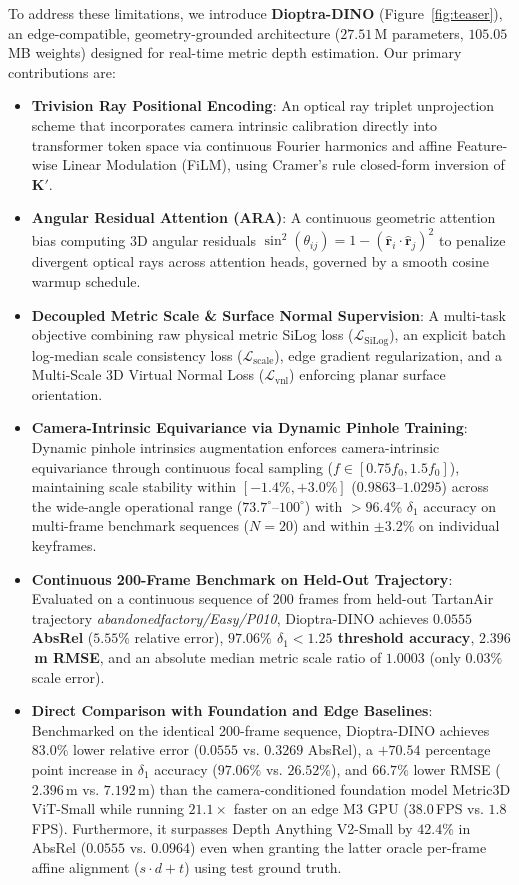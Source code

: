 To address these limitations, we introduce \textbf{Dioptra-DINO} (Figure~\ref{fig:teaser}), an edge-compatible, geometry-grounded architecture ($27.51$\,M parameters, $105.05$\,MB weights) designed for real-time metric depth estimation. Our primary contributions are:
\begin{itemize}
    \item \textbf{Trivision Ray Positional Encoding}: An optical ray triplet unprojection scheme that incorporates camera intrinsic calibration directly into transformer token space via continuous Fourier harmonics and affine Feature-wise Linear Modulation (FiLM), using Cramer's rule closed-form inversion of $\mathbf{K}'$.
    \item \textbf{Angular Residual Attention (ARA)}: A continuous geometric attention bias computing 3D angular residuals $\sin^2(\theta_{ij}) = 1 - (\hat{\mathbf{r}}_i \cdot \hat{\mathbf{r}}_j)^2$ to penalize divergent optical rays across attention heads, governed by a smooth cosine warmup schedule.
    \item \textbf{Decoupled Metric Scale \& Surface Normal Supervision}: A multi-task objective combining raw physical metric SiLog loss ($\mathcal{L}_{\text{SiLog}}$), an explicit batch log-median scale consistency loss ($\mathcal{L}_{\text{scale}}$), edge gradient regularization, and a Multi-Scale 3D Virtual Normal Loss ($\mathcal{L}_{\text{vnl}}$) enforcing planar surface orientation.
    \item \textbf{Camera-Intrinsic Equivariance via Dynamic Pinhole Training}: Dynamic pinhole intrinsics augmentation enforces camera-intrinsic equivariance through continuous focal sampling ($f \in [0.75f_0, 1.5f_0]$), maintaining scale stability within $[-1.4\%, +3.0\%]$ ($0.9863\text{--}1.0295$) across the wide-angle operational range ($73.7^\circ \text{--} 100^\circ$) with $>96.4\%$ $\delta_1$ accuracy on multi-frame benchmark sequences ($N=20$) and within $\pm 3.2\%$ on individual keyframes.
    \item \textbf{Continuous 200-Frame Benchmark on Held-Out Trajectory}: Evaluated on a continuous sequence of 200 frames from held-out TartanAir trajectory \textit{abandonedfactory/Easy/P010}, Dioptra-DINO achieves \textbf{$0.0555$ AbsRel} ($5.55\%$ relative error), \textbf{$97.06\%$ $\delta_1 < 1.25$ threshold accuracy}, \textbf{$2.396$\,m RMSE}, and an absolute median metric scale ratio of \textbf{$1.0003$} (only $0.03\%$ scale error).
    \item \textbf{Direct Comparison with Foundation and Edge Baselines}: Benchmarked on the identical 200-frame sequence, Dioptra-DINO achieves $83.0\%$ lower relative error ($0.0555$ vs. $0.3269$ AbsRel), a $+70.54$ percentage point increase in $\delta_1$ accuracy ($97.06\%$ vs. $26.52\%$), and $66.7\%$ lower RMSE ($2.396$\,m vs. $7.192$\,m) than the camera-conditioned foundation model Metric3D ViT-Small while running $21.1\times$ faster on an edge M3 GPU ($38.0$\,FPS vs. $1.8$\,FPS). Furthermore, it surpasses Depth Anything V2-Small by $42.4\%$ in AbsRel ($0.0555$ vs. $0.0964$) even when granting the latter oracle per-frame affine alignment ($s \cdot d + t$) using test ground truth.

\end{itemize}
